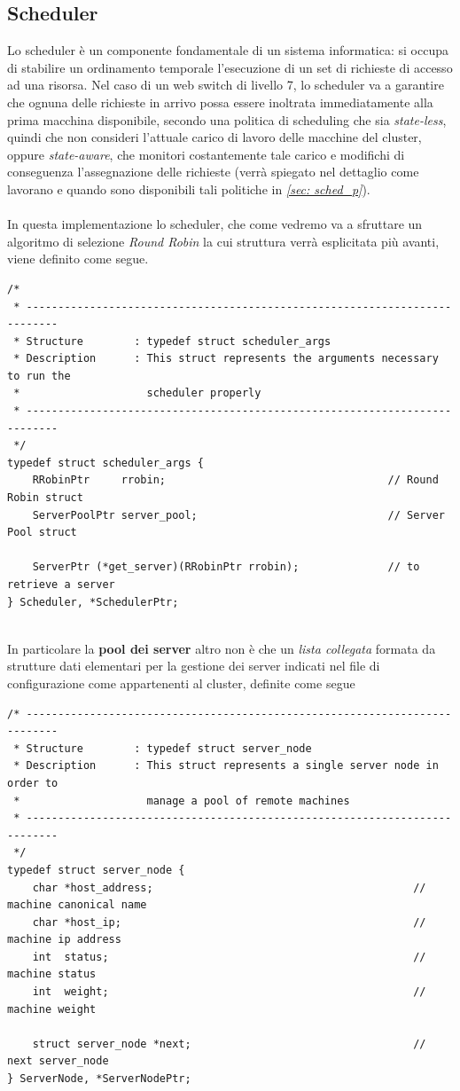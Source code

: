 \documentclass[italian]{tktltiki2}
\begin{document}
\subsection{Scheduler}
\label{ssec: sched}
Lo scheduler è un componente fondamentale di un sistema informatica: si occupa di stabilire un ordinamento temporale l'esecuzione di un set di richieste di accesso ad una risorsa. Nel caso di un web switch di livello 7, lo scheduler va a garantire che ognuna delle richieste in arrivo possa essere inoltrata immediatamente alla prima macchina disponibile, secondo una politica di scheduling che sia \emph{state-less}, quindi che non consideri l'attuale carico di lavoro delle macchine del cluster, oppure \emph{state-aware}, che monitori costantemente tale carico e modifichi di conseguenza l'assegnazione delle richieste (verrà spiegato nel dettaglio come lavorano e quando sono disponibili tali politiche in \emph{\ref{sec: sched_p}}). \\\\
In questa implementazione lo scheduler, che come vedremo va a sfruttare un algoritmo di selezione \emph{Round Robin} la cui struttura verrà esplicitata più avanti, viene definito come segue.
\begin{lstlisting}
/*
 * ---------------------------------------------------------------------------
 * Structure        : typedef struct scheduler_args
 * Description      : This struct represents the arguments necessary to run the
 *                    scheduler properly
 * ---------------------------------------------------------------------------
 */
typedef struct scheduler_args {
    RRobinPtr     rrobin;                                   // Round Robin struct
    ServerPoolPtr server_pool;                              // Server Pool struct

    ServerPtr (*get_server)(RRobinPtr rrobin);              // to retrieve a server
} Scheduler, *SchedulerPtr;


\end{lstlisting}
In particolare la \textbf{pool dei server} altro non è che un \emph{lista collegata} formata da strutture dati elementari per la gestione dei server indicati nel file di configurazione come appartenenti al cluster, definite come segue
\begin{lstlisting}
/* ---------------------------------------------------------------------------
 * Structure        : typedef struct server_node
 * Description      : This struct represents a single server node in order to
 *                    manage a pool of remote machines
 * ---------------------------------------------------------------------------
 */
typedef struct server_node {
    char *host_address;                                         // machine canonical name
    char *host_ip;                                              // machine ip address
    int  status;                                                // machine status
    int  weight;                                                // machine weight

    struct server_node *next;                                   // next server_node
} ServerNode, *ServerNodePtr;

\end{lstlisting}
\end{document}
